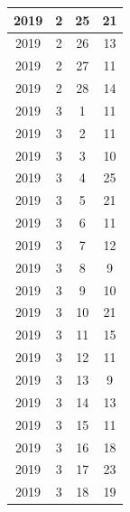 \begin{longtable} {|c|c|c|c|}
\hline
2019         & 2            & 25           & 21                        \\ 
\hline
2019         & 2            & 26           & 13                        \\ 
\hline
2019         & 2            & 27           & 11                        \\ 
\hline
2019         & 2            & 28           & 14                        \\ 
\hline
2019         & 3            & 1            & 11                        \\ 
\hline
2019         & 3            & 2            & 11                        \\ 
\hline
2019         & 3            & 3            & 10                        \\ 
\hline
2019         & 3            & 4            & 25                        \\ 
\hline
2019         & 3            & 5            & 21                        \\ 
\hline
2019         & 3            & 6            & 11                        \\ 
\hline
2019         & 3            & 7            & 12                        \\ 
\hline
2019         & 3            & 8            & 9                         \\ 
\hline
2019         & 3            & 9            & 10                        \\ 
\hline
2019         & 3            & 10           & 21                        \\ 
\hline
2019         & 3            & 11           & 15                        \\ 
\hline
2019         & 3            & 12           & 11                        \\ 
\hline
2019         & 3            & 13           & 9                         \\ 
\hline
2019         & 3            & 14           & 13                        \\ 
\hline
2019         & 3            & 15           & 11                        \\ 
\hline
2019         & 3            & 16           & 18                        \\ 
\hline
2019         & 3            & 17           & 23                        \\ 
\hline
2019         & 3            & 18           & 19                        \\ 

\end{longtable}
